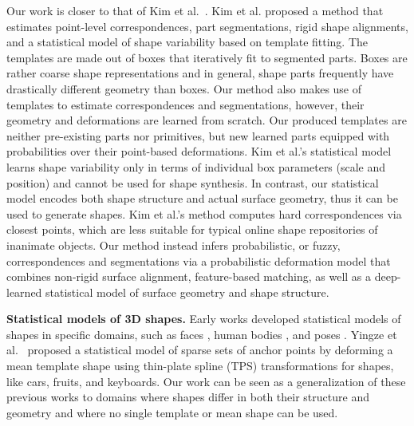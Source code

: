 Our work is closer to that of Kim et al.~. Kim et al. proposed a method that estimates point-level correspondences, part segmentations, rigid shape alignments, and a statistical model of shape variability based on template fitting. The templates are made out of boxes that iteratively fit to segmented parts. Boxes are rather coarse shape representations and in general, shape parts frequently have drastically different geometry than boxes. Our method also makes use of templates to estimate correspondences and segmentations, however, their geometry and deformations are learned from scratch. Our produced templates are neither pre-existing parts nor primitives, but new learned parts equipped with probabilities over their point-based deformations. Kim et al.'s statistical model learns shape variability only in terms of individual box parameters (scale and position) and cannot be used for shape synthesis. In contrast, our statistical model encodes both shape structure and actual surface geometry, thus it can be used to generate shapes. Kim et al.'s method computes hard correspondences via closest points, which are less suitable for typical online shape repositories of inanimate objects. Our method instead infers probabilistic, or fuzzy, correspondences and segmentations via a probabilistic deformation model that combines non-rigid surface alignment, feature-based matching, as well as a deep-learned statistical model of surface geometry and shape structure.  

\textbf{Statistical models of 3D shapes.} Early works developed statistical models of shapes in specific domains, such as faces \cite{Blanz99}, human bodies \cite{Allen03}, and poses \cite{Anguelov05}. Yingze et al.~ proposed a statistical model of sparse sets of anchor points by deforming a mean template shape using thin-plate spline (TPS) transformations for shapes, like cars, fruits, and keyboards. Our work can be seen as a generalization of these previous works to domains where shapes differ in both their structure and geometry and where no single template or mean shape can be used. 

